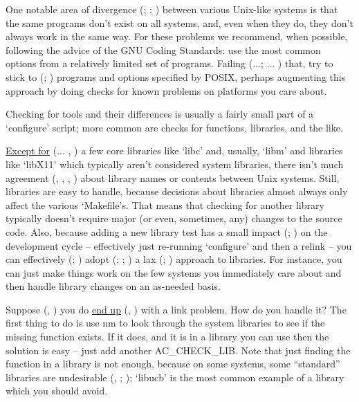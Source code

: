 One notable area of divergence ({\MiQ{}}; {\MaQ{}}; {\MbQ{}}) between various Unix-like 
systems is that the same programs don't exist on all systems, and, even when 
they do, they don't always work in the same way. For these problems we 
recommend, when possible, following the advice of the GNU Coding Standards: 
use the most common options from a relatively limited set of programs. 
Failing ({\MaQ{}}...; {\McQ{}}... {\MbQ{}}) that, try to stick to ({\MfQ{}}; {\MaQ{}})
programs and options specified by POSIX, perhaps augmenting this approach 
by doing checks for known problems on platforms you care about. 


Checking for tools and their differences is usually a fairly small part of a `configure' script; more common are checks for functions, libraries, and the like. 


\underline{Except for} ({\McQ{}}... {\MaQ{}}, {\McQ{}}) a few core libraries 
like `libc' and, usually, `libm' and libraries like `libX11' which typically 
aren't considered system libraries, there isn't much 
agreement ({\MaQ{}}, {\McQ{}}, {\MaQ{}}, {\MaQ{}}) about library 
names or contents between Unix systems. Still, libraries are easy to handle,
because decisions about libraries almost always only affect the 
various `Makefile's. That means that checking for another library typically 
doesn't require major (or even, sometimes, any) changes to the source code.
Also, because adding a new library test has a small impact ({\MfQ{}}; {\MaQ{}}) on the 
development cycle -- effectively just re-running `configure' and then a 
relink -- you can effectively ({\MbQ{}}; {\MbQ{}}) adopt ({\MbQ{}}; {\MbQ{}}; {\MdQ{}}) a 
lax ({\MaQ{}}; {\McQ{}}) approach to libraries. For instance, you can just 
make things work on the few systems you immediately care about and then 
handle library changes on an as-needed basis. 


Suppose ({\MmQ{}}, {\MaQ{}}) you do \underline{end up} ({\McQ{}}, {\MbQ{}}) with a link 
problem. How do you handle it? The 
first thing to do is use nm to look through the system libraries to see 
if the missing function exists. If it does, and it is in a library you 
can use then the solution is easy -- just add another AC\_{}CHECK\_{}LIB.
Note that just finding the function in a library is not enough, because on 
some systems, some ``standard'' libraries are 
undesirable ({\MaQ{}}, {\MaQ{}}; {\McQ{}}); `libucb' is the 
most common example of a library which you should avoid. 

